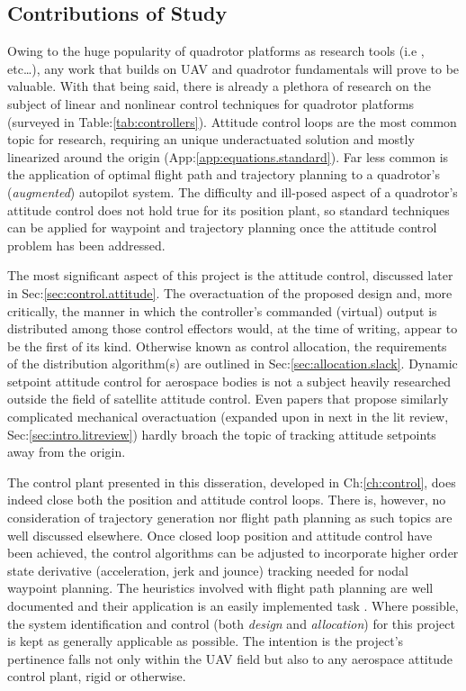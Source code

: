 \subsection{Contributions of Study}
\label{subsec:intro.foreword.significance}
Owing to the huge popularity of quadrotor platforms as research tools (i.e \cite{x4flyercontrol,intelligentbackstep,fullquadcoptercontrol}, etc\ldots), any work that builds on UAV and quadrotor fundamentals will prove to be valuable. With that being said, there is already a plethora of research on the subject of linear and nonlinear control techniques for quadrotor platforms (surveyed in Table:\ref{tab:controllers}). Attitude control loops are the most common topic for research, requiring an unique underactuated solution and mostly linearized around the origin (App:\ref{app:equations.standard}). Far less common is the application of optimal flight path and trajectory planning to a quadrotor's (\emph{augmented}) autopilot system. The difficulty and ill-posed aspect of a quadrotor's attitude control does not hold true for its position plant, so standard techniques can be applied for waypoint and trajectory planning once the attitude control problem has been addressed.
\par
The most significant aspect of this project is the attitude control, discussed later in Sec:\ref{sec:control.attitude}. The overactuation of the proposed design and, more critically, the manner in which the controller's commanded (virtual) output is distributed among those control effectors would, at the time of writing, appear to be the first of its kind. Otherwise known as control allocation, the requirements of the distribution algorithm(s) are outlined in Sec:\ref{sec:allocation.slack}. Dynamic setpoint attitude control for aerospace bodies is not a subject heavily researched outside the field of satellite attitude control. Even papers that propose similarly complicated mechanical overactuation (expanded upon in next in the lit review, Sec:\ref{sec:intro.litreview}) hardly broach the topic of tracking attitude setpoints away from the origin.
\par
The control plant presented in this disseration, developed in Ch:\ref{ch:control}, does indeed close both the position and attitude control loops. There is, however, no consideration of trajectory generation nor flight path planning as such topics are well discussed elsewhere. Once closed loop position and attitude control have been achieved, the control algorithms can be adjusted to incorporate higher order state derivative (acceleration, jerk and jounce) tracking needed for nodal waypoint planning. The heuristics involved with flight path planning are well documented and their application is an easily implemented task \cite{trajectorygeneration,planning,trajectorytracking}. Where possible, the system identification and control (both \emph{design} and \emph{allocation}) for this project is kept as generally applicable as possible. The intention is the project's pertinence falls not only within the UAV field but also to any aerospace attitude control plant, rigid or otherwise. 
